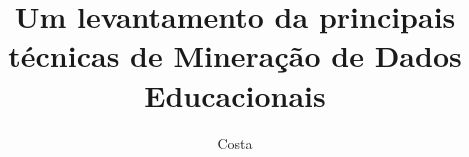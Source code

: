 \documentclass[ti]{texufpel} %
\title{Um levantamento da principais técnicas de Mineração de Dados Educacionais}
\author{Costa}{Alexandre Gomes da}
\begin{document}

\maketitle 

\sloppy




\end{document}
